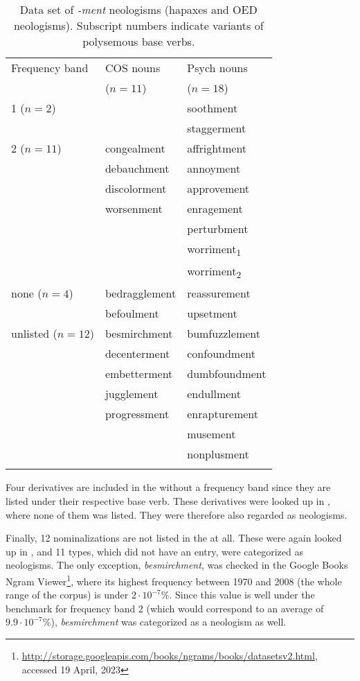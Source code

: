 \begin{table}
	\caption{Data set of \textit{-ment} neologisms (hapaxes and OED neologisms). Subscript numbers indicate variants of polysemous base verbs.\label{tab:neoldata set}} 
		\begin{tabular}{lll}
			\lsptoprule
			Frequency band& COS nouns  & Psych nouns \\
			&  ($n=11$) &  ($n=18$) \\
			\midrule 
			1 ($n=2$) & & {soothment}\\ 
		              & & {staggerment} \\ 
			2 ($n=11$) & {congealment} & {affrightment}\\ 
			& {debauchment} & {annoyment}\\ 
			& {discolorment} & {approvement}\\ 
			& {worsenment} & {enragement}\\ 
			&& {perturbment}\\ 
			&& {worriment}\textsubscript{1}\\ 
			&& {worriment}\textsubscript{2}\\ 
			none ($n=4$) & {bedragglement} & {reassurement} \\ 
			& {befoulment} & {upsetment} \\ 
			unlisted ($n=12$) & {besmirchment} & {bumfuzzlement} \\ 
			& {decenterment} & {confoundment} \\ 
			& {embetterment} & {dumbfoundment} \\ 
			& {jugglement} & {endullment} \\ 
			& {progressment} & {enrapturement}\\ 
			&& {musement} \\
			&& {nonplusment} \\ 
			\lspbottomrule
		\end{tabular} 
\end{table}

Four derivatives are included in the  without a frequency band since they are listed under their respective base verb. These derivatives were looked up in \citet{Webster}, where none of them was listed. They were therefore also regarded as neologisms.

Finally, 12 nominalizations are not listed in the  at all. These were again looked up in \citet{Webster}, and 11 types, which did not have an entry, were categorized as neologisms. The only exception, \textit{besmirchment}, was checked in the Google Books Ngram Viewer\footnote{\url{http://storage.googleapis.com/books/ngrams/books/datasetsv2.html}, accessed 19 April, 2023}, where its highest frequency between 1970 and 2008 (the whole range of the corpus) is under $2\cdot10^{-7}\%$. Since this value is well under the benchmark for frequency band 2 (which would correspond to an average of $9.9\cdot10^{-7}\%$), \textit{besmirchment} was categorized as a neologism as well.\largerpage 

